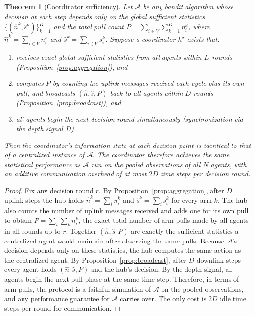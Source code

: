 \documentclass{article}
\newtheorem{theorem}{Theorem}
\begin{document}
\begin{theorem}[Coordinator sufficiency]
\label{thm:coordinator}
Let $\mathcal{A}$ be any bandit algorithm whose decision at each step depends only on the global sufficient statistics $\{(\hat{n}^k, \hat{s}^k)\}_{k=1}^K$ and the total pull count $P = \sum_{i \in V}\sum_{k=1}^K n_i^k$, where $\hat{n}^k = \sum_{i \in V} n_i^k$ and $\hat{s}^k = \sum_{i \in V} s_i^k$. Suppose a coordinator $h^\star$ exists that:
\begin{enumerate}
    \item receives exact global sufficient statistics from all agents within $D$ rounds (Proposition~\ref{prop:aggregation}), and
    \item computes $P$ by counting the uplink messages received each cycle plus its own pull, and broadcasts $(\hat{n}, \hat{s}, P)$ back to all agents within $D$ rounds (Proposition~\ref{prop:broadcast}), and
    \item all agents begin the next decision round simultaneously (synchronization via the depth signal $D$).
\end{enumerate}
Then the coordinator's information state at each decision point is identical to that of a centralized instance of $\mathcal{A}$. The coordinator therefore achieves the same statistical performance as $\mathcal{A}$ run on the pooled observations of all $N$ agents, with an additive communication overhead of at most $2D$ time steps per decision round.
\end{theorem}

\begin{proof}
Fix any decision round $r$. By Proposition~\ref{prop:aggregation}, after $D$ uplink steps the hub holds $\hat{n}^k = \sum_i n_i^k$ and $\hat{s}^k = \sum_i s_i^k$ for every arm $k$. The hub also counts the number of uplink messages received and adds one for its own pull to obtain $P = \sum_i \sum_k n_i^k$, the exact total number of arm pulls made by all agents in all rounds up to $r$. Together $(\hat{n}, \hat{s}, P)$ are exactly the sufficient statistics a centralized agent would maintain after observing the same pulls. Because $\mathcal{A}$'s decision depends only on these statistics, the hub computes the same action as the centralized agent. By Proposition~\ref{prop:broadcast}, after $D$ downlink steps every agent holds $(\hat{n}, \hat{s}, P)$ and the hub's decision. By the depth signal, all agents begin the next pull phase at the same time step. Therefore, in terms of arm pulls, the protocol is a faithful simulation of $\mathcal{A}$ on the pooled observations, and any performance guarantee for $\mathcal{A}$ carries over. The only cost is $2D$ idle time steps per round for communication.
\end{proof}
\end{document}
